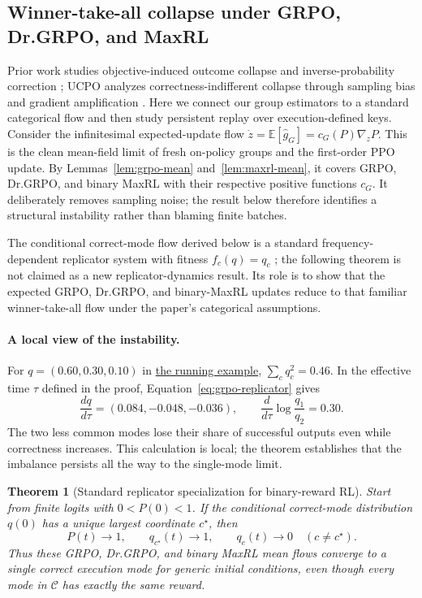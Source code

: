 \documentclass{article}
\newcommand{\1}{\mathbf 1}
\newcommand{\E}{\mathbb E}
\newtheorem{theorem}[lemma]{Theorem}
\theoremstyle{remark}
\theoremstyle{definition}
\theoremstyle{plain}
\begin{document}
\subsection{Winner-take-all collapse under GRPO, Dr.GRPO, and MaxRL}
\label{app:theory-collapse}

Prior work studies objective-induced outcome collapse and inverse-probability
correction \citep{sinha2026expected}; UCPO analyzes correctness-indifferent collapse
through sampling bias and gradient amplification \citep[Section~4]{lochab2026ucpo}.
Here we connect our group estimators to a standard categorical flow and then study
persistent replay over execution-defined keys.
Consider the infinitesimal expected-update flow
$\dot z=\E[\widehat g_G]=c_G(P)\nabla_zP$. This is the clean mean-field limit
of fresh on-policy groups and the first-order PPO update. By Lemmas~\ref{lem:grpo-mean} and~\ref{lem:maxrl-mean}, it covers GRPO, Dr.GRPO, and binary MaxRL with their respective positive functions $c_G$. It deliberately
removes sampling noise; the result below therefore identifies a structural
instability rather than blaming finite batches.

The conditional correct-mode flow derived below is a standard
frequency-dependent replicator system with fitness $f_c(q)=q_c$
\citep{hofbauer1998evolutionary}; the following
theorem is not claimed as a new replicator-dynamics result. Its role is to show
that the expected GRPO, Dr.GRPO, and binary-MaxRL updates reduce to that
familiar winner-take-all flow under the paper's categorical assumptions.

\paragraph{A local view of the instability.}
For $q=(0.60,0.30,0.10)$ in \hyperref[ex:theory-running]{the running example},
$\sum_cq_c^2=0.46$. In the effective time $\tau$ defined in the proof,
Equation~\eqref{eq:grpo-replicator} gives
\[
 \frac{dq}{d\tau}=(0.084,-0.048,-0.036),\qquad
 \frac{d}{d\tau}\log\frac{q_1}{q_2}=0.30.
\]
The two less common modes lose their share of successful outputs even while
correctness increases. This calculation is local; the theorem establishes
that the imbalance persists all the way to the single-mode limit.

\begin{theorem}[Standard replicator specialization for binary-reward RL]
\label{thm:grpo-collapse}
Start from finite logits with $0<P(0)<1$. If the conditional correct-mode
distribution $q(0)$ has a unique largest coordinate $c^\star$, then
\[
  P(t)\longrightarrow1,
  \qquad
  q_{c^\star}(t)\longrightarrow1,
  \qquad
  q_c(t)\longrightarrow0\quad(c\ne c^\star).
\]
Thus these GRPO, Dr.GRPO, and binary MaxRL mean flows converge to a single
correct execution mode for generic initial conditions, even though every mode
in $\mathcal C$ has exactly the same reward.
\end{theorem}
\end{document}
